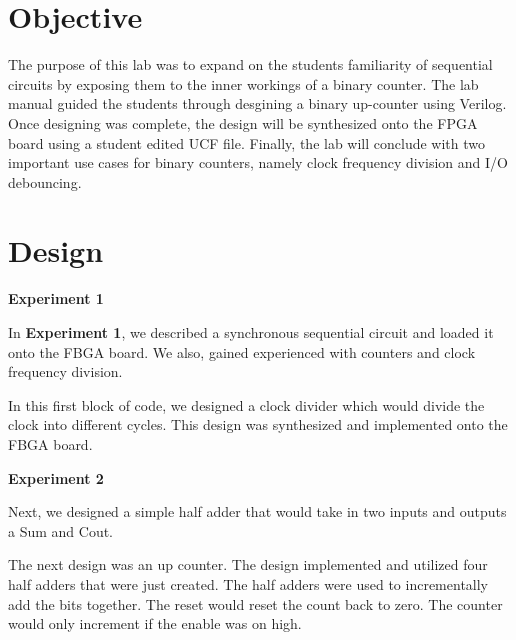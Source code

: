 \documentclass[a4paper,12pt]{article}
\begin{document}
\section*{Objective}

  \hspace{15pt}The purpose of this lab was to expand on the students familiarity of sequential circuits
  by exposing them to the inner workings of a binary counter. The lab manual guided the students
  through desgining a binary up-counter using Verilog. Once designing was complete, the design
  will be synthesized onto the FPGA board using a student edited UCF file. Finally, the lab
  will conclude with two important use cases for binary counters, namely clock frequency division
  and I/O debouncing.

\section*{Design}

  \textbf{Experiment 1}
  
  \vspace{5pt}
  
  In \textbf{Experiment 1}, we described a synchronous sequential circuit and loaded it onto the FBGA board. We also, gained experienced with counters and clock frequency 
  division.
  
  In this first block of code, we designed a clock divider which would divide the clock into different cycles. This design was synthesized and implemented onto the FBGA board.

  
  
  \textbf{Experiment 2}

  Next, we designed a simple half adder that would take in two inputs and outputs a Sum and Cout.

  
  
  The next design was an up counter. The design implemented and utilized four half adders that were just created. The half adders were used to incrementally add the bits 
  together. The reset would reset the count back to zero. The counter would only increment if the enable was on high. 
\end{document}
